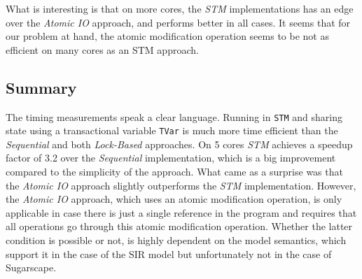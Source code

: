 What is interesting is that on more cores, the \textit{STM} implementations has an edge over the \textit{Atomic IO} approach, and performs better in all cases. It seems that for our problem at hand, the atomic modification operation seems to be not as efficient on many cores as an STM approach. 

%

\subsection{Summary}

The timing measurements speak a clear language. Running in \texttt{STM} and sharing state using a transactional variable \texttt{TVar} is much more time efficient than the \textit{Sequential} and both \textit{Lock-Based} approaches. On 5 cores \textit{STM} achieves a speedup factor of 3.2 over the \textit{Sequential} implementation, which is a big improvement compared to the simplicity of the approach. What came as a surprise was that the \textit{Atomic IO} approach slightly outperforms the \textit{STM} implementation. However, the \textit{Atomic IO} approach, which uses an atomic modification operation, is only applicable in case there is just a single reference in the program and requires that all operations go through this atomic modification operation. Whether the latter condition is possible or not, is highly dependent on the model semantics, which support it in the case of the SIR model but unfortunately not in the case of Sugarscape.

